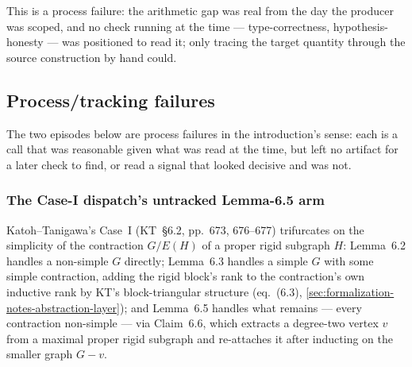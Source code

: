 This is a process failure: the arithmetic gap was real from the day the
producer was scoped, and no check running at the time --- type-correctness,
hypothesis-honesty --- was positioned to read it; only tracing the target
quantity through the source construction by hand could.

\subsection{Process/tracking failures}
\label{sec:formalization-notes-process-tracking}

The two episodes below are process failures in the introduction's sense:
each is a call that was reasonable given what was read at the time, but
left no artifact for a later check to find, or read a signal that looked
decisive and was not.

\subsubsection{The Case-I dispatch's untracked Lemma-6.5 arm}

Katoh--Tanigawa's Case~I (KT~\S6.2, pp.~673, 676--677) trifurcates on the
simplicity of the contraction $G/E(H)$ of a proper rigid subgraph $H$:
Lemma~6.2 handles a non-simple $G$ directly; Lemma~6.3 handles a simple
$G$ with some simple contraction, adding the rigid block's rank to the
contraction's own inductive rank by KT's block-triangular structure
(eq.~(6.3), \cref{sec:formalization-notes-abstraction-layer}); and
Lemma~6.5 handles what remains --- every contraction non-simple --- via
Claim~6.6, which extracts a degree-two vertex $v$ from a maximal proper
rigid subgraph and re-attaches it after inducting on the smaller graph
$G - v$.

